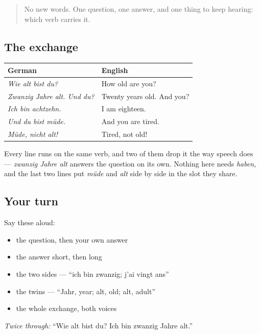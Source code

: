 \label{lesson:GE-C14-alter-practice}



\begin{quote}
No new words. One question, one answer, and one thing to keep hearing: which verb carries it.
\end{quote}

\subsection*{The exchange}
\noindent
\begin{tabularx}{\linewidth}{@{}>{\raggedright\arraybackslash}X>{\raggedright\arraybackslash}X@{}}
\toprule
\textbf{German} & \textbf{English} \\
\midrule
\emph{Wie alt bist du?} & How old are you? \\
\emph{Zwanzig Jahre alt. Und du?} & Twenty years old. And you? \\
\emph{Ich bin achtzehn.} & I am eighteen. \\
\emph{Und du bist müde.} & And you are tired. \\
\emph{Müde, nicht alt!} & Tired, not old! \\
\bottomrule
\end{tabularx}

Every line runs on the same verb, and two of them drop it the way speech does — \emph{zwanzig Jahre alt} answers the question on its own. Nothing here needs \emph{haben}, and the last two lines put \emph{müde} and \emph{alt} side by side in the slot they share.

\subsection*{Your turn}
Say these aloud:

\begin{itemize}
\raggedright
  \item the question, then your own answer
  \item the answer short, then long
  \item the two sides — \textquotedblleft{}ich bin zwanzig; j'ai vingt ans\textquotedblright{}
  \item the twins — \textquotedblleft{}Jahr, year; alt, old; alt, adult\textquotedblright{}
  \item the whole exchange, both voices
\end{itemize}

\emph{Twice through:} \textquotedblleft{}Wie alt bist du? Ich bin zwanzig Jahre alt.\textquotedblright{}

